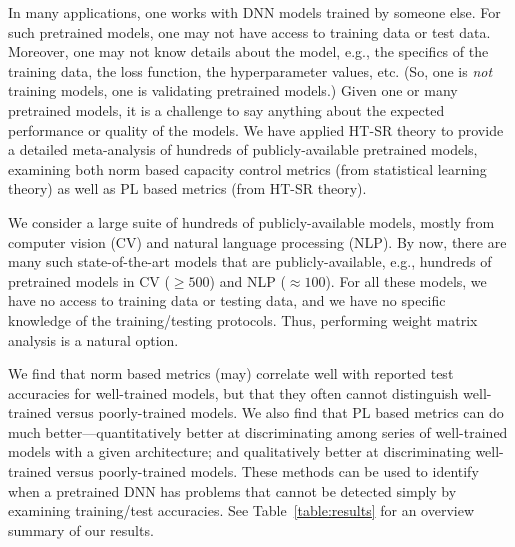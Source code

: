 \documentclass{article}
\begin{document}
In many applications, one works with DNN models trained by someone else.
For such pretrained models, one may not have access to training data or test data.
Moreover, one may not know details about the model, e.g., the specifics of the training data, the loss function, the hyperparameter values, etc.
(So, one is \emph{not} training models, one is validating pretrained models.)
Given one or many pretrained models, it is a challenge to say anything about the expected performance or quality of the models.
We have applied HT-SR theory to provide a detailed meta-analysis of hundreds of publicly-available pretrained models, examining both norm based capacity control metrics (from statistical learning theory) as well as PL based metrics (from HT-SR theory).

We consider a large suite of hundreds of publicly-available models, mostly from computer vision (CV) and natural language processing (NLP).
By now, there are many such state-of-the-art models that are publicly-available, e.g., 
hundreds of pretrained models in CV ($\ge 500$) and NLP ($\approx 100$).
For all these models, we have no access to training data or testing data, and we have no specific knowledge of the training/testing protocols. 
Thus, performing weight matrix analysis is a natural option.


We find that norm based metrics (may) correlate well with reported test accuracies for well-trained models, 
but that they often cannot distinguish well-trained versus poorly-trained models.
We also find that PL based metrics can do much better---quantitatively better at discriminating among series of well-trained models with a given architecture; and qualitatively better at discriminating well-trained versus poorly-trained models.
These methods can be used to identify when a pretrained DNN has problems that cannot be detected simply by examining training/test accuracies.
%
See Table~\ref{table:results} for an overview summary of our results.
\end{document}
